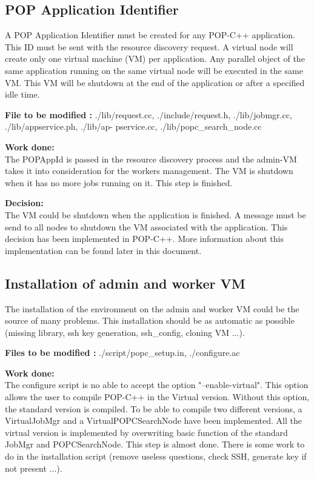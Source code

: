 \subsection{POP Application Identifier}
A POP Application Identifier must be created for any POP-C++ application. This ID must be sent with the resource discovery request. A virtual node will create only one virtual machine (VM) per application. Any parallel object of the same application running on the same virtual node will be executed in the same VM. This VM will be shutdown at the end of the application or after a specified idle time.\s

\textbf{File to be modified : } ./lib/request.cc, ./include/request.h, ./lib/jobmgr.cc, ./lib/appservice.ph, ./lib/ap- pservice.cc, ./lib/popc\_search\_node.cc\s

\textbf{Work done:}\\
The POPAppId is passed in the resource discovery process and the admin-VM takes it into consideration for the workers management. The VM is shutdown when it has no more jobs running on it. This step is finished.\s

\textbf{Decision:}\\
The VM could be shutdown when the application is finished. A message must be send to all nodes to shutdown the VM associated with the application. This decision has been implemented in POP-C++. More information about this implementation can be found later in this document. 

\subsection{Installation of admin and worker VM}
The installation of the environment on the admin and worker VM could be the source of many problems. This installation should be as automatic as possible (missing library, ssh key generation, ssh\_config, cloning VM ...).\s

\textbf{Files to be modified : } ./script/popc\_setup.in, ./configure.ac\s

\textbf{Work done:}\\
The configure script is no able to accept the option "--enable-virtual". This option allows the user to compile POP-C++ in the Virtual version. Without this option, the standard version is compiled. To be able to compile two different versions, a VirtualJobMgr and a VirtualPOPCSearchNode have been implemented. All the virtual version is implemented by overwriting basic function of the standard JobMgr and POPCSearchNode. This step is almost done. There is some work to do in the installation script (remove useless questions, check SSH, generate key if not present ...). \s

